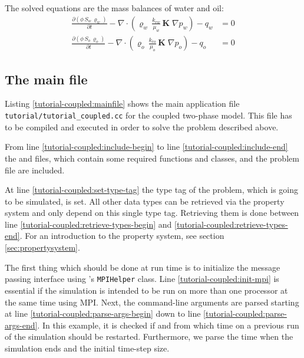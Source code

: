 The solved equations are the mass balances of water and oil:
\begin{align}
  \label{massbalancewater}
  \frac {\partial (\phi \, S_{w}\, \varrho_{w})}{\partial t}
  -
  \nabla \cdot \left( \varrho_{w} \, \frac{k_{rw}}{\mu_{w}} \, \mathbf{K}\;\nabla p_w \right)
  -
  q_w
  & =
  0 \\
  \label{massbalanceoil}
  \frac {\partial (\phi \, S_{o}\, \varrho_{o})}{\partial t}
  -
  \nabla \cdot \left( \varrho_{o} \, \frac{k_{ro}}{\mu_{o}} \, \mathbf{K}\;\nabla p_o \right)
  -
  q_o 
  & =
  0
\end{align}

\subsection{The main file}

Listing \ref{tutorial-coupled:mainfile} shows the main application file
\texttt{tutorial/tutorial\_coupled.cc} for the coupled two-phase
model. This file has to be compiled and executed in order to solve the problem described
above.

\begin{lst}\label{tutorial-coupled:mainfile} \mbox{}
  
\end{lst}

From line \ref{tutorial-coupled:include-begin} to line
\ref{tutorial-coupled:include-end} the \Dune and \Dumux files, which
contain some required functions and classes, and the problem file are included. 

At line \ref{tutorial-coupled:set-type-tag} the type tag of the
problem, which is going to be simulated, is set. All other data types
can be retrieved via the \Dumux property system and only depend on this
single type tag. Retrieving them is done between line
\ref{tutorial-coupled:retrieve-types-begin} and
\ref{tutorial-coupled:retrieve-types-end}. For an introduction to the
property system, see section \ref{sec:propertysystem}.

The first thing which should be done at run time is to initialize the
message passing interface using \Dune's \texttt{MPIHelper} class. Line
\ref{tutorial-coupled:init-mpi} is essential if the simulation is
intended to be run on more than one processor at the same time using MPI. Next,
the command-line arguments are parsed starting at line
\ref{tutorial-coupled:parse-args-begin} down to line
\ref{tutorial-coupled:parse-args-end}. In this example, it is checked if and
from which time on a previous run of the simulation should be restarted. Furthermore, we
parse the time when the simulation ends and the initial time-step size.

